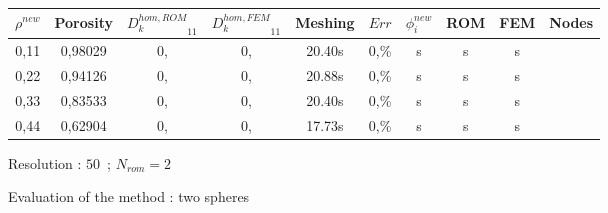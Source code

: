 {\begin{figure}[H]%
%
\begin{center}
\begin{tabular}{|c|c||c|c||c|c||c|c||c||c|}
\hline
\rowcolor{lightgray} $\rho^{new}$&Porosity&${D_k^{hom,ROM}}_{11}$&${D_k^{hom,FEM}}_{11}$&Meshing&$Err$&$\phi_i^{new}$&ROM&FEM&Nodes\\
\hline
0,11&0,98029&0,&0,&20.40s&0,\%&s&s&s&\\
\hline
0,22&0,94126&0,&0,&20.88s&0,\%&s&s&s&\\
\hline
0,33&0,83533&0,&0,&20.40s&0,\%&s&s&s&\\
\hline
0,44&0,62904&0,&0,&17.73s&0,\%&s&s&s&\\
\hline
\end{tabular}
\end{center}
\caption{Resolution : $50$\ ; $N_{rom}=2$}
%
\end{figure}

\ligneinter
\begin{figure}[H]%
%
\begin{table}[H]
\begin{center}
%
%
\qquad
{}%
%
\end{center}
\end{table}
%
\caption{Evaluation of the method : two spheres}
\end{figure}

}

